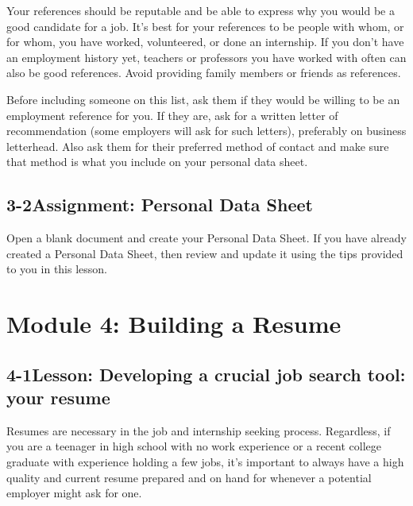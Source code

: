 Your references should be reputable and be able to express why you would be a good candidate for a job. It's best for your references to be people with whom, or for whom, you have worked, volunteered, or done an internship. If you don't have an employment history yet, teachers or professors you have worked with often can also be good references. Avoid providing family members or friends as references.

Before including someone on this list, ask them if they would be willing to be an employment reference for you. If they are, ask for a written letter of recommendation (some employers will ask for such letters), preferably on business letterhead. Also ask them for their preferred method of contact and make sure that method is what you include on your personal data sheet.

\pagebreak \subsection*{3-2\quad Assignment: Personal Data Sheet}
Open a blank document and create your Personal Data Sheet. If you have already created a Personal Data Sheet, then review and update it using the tips provided to you in this lesson.
 
 
\pagebreak \section*{Module 4:	Building a Resume}
\noindent\makebox[\textwidth]{\rule{\linewidth}{0.4pt}}  \localtableofcontents 
\noindent\makebox[\textwidth]{\rule{\linewidth}{0.4pt}} 


\pagebreak \subsection*{4-1\quad Lesson: Developing a crucial job search tool: your resume}
Resumes are necessary in the job and internship seeking process. Regardless, if you are a teenager in high school with no work experience or a recent college graduate with experience holding a few jobs, it's important to always have a high quality and current resume prepared and on hand for whenever a potential employer might ask for one.

